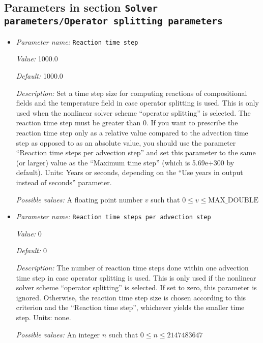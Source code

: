 \subsection{Parameters in section \tt Solver parameters/Operator splitting parameters}
\label{parameters:Solver_20parameters/Operator_20splitting_20parameters}

\begin{itemize}
\item {\it Parameter name:} {\tt Reaction time step}
\label{parameters:Solver parameters/Operator splitting parameters/Reaction time step}


{\it Value:} 1000.0


{\it Default:} 1000.0


{\it Description:} Set a time step size for computing reactions of compositional fields and the temperature field in case operator splitting is used. This is only used when the nonlinear solver scheme ``operator splitting'' is selected. The reaction time step must be greater than 0. If you want to prescribe the reaction time step only as a relative value compared to the advection time step as opposed to as an absolute value, you should use the parameter ``Reaction time steps per advection step'' and set this parameter to the same (or larger) value as the ``Maximum time step'' (which is 5.69e+300 by default). Units: Years or seconds, depending on the ``Use years in output instead of seconds'' parameter.


{\it Possible values:} A floating point number $v$ such that $0 \leq v \leq \text{MAX\_DOUBLE}$
\item {\it Parameter name:} {\tt Reaction time steps per advection step}
\label{parameters:Solver parameters/Operator splitting parameters/Reaction time steps per advection step}


{\it Value:} 0


{\it Default:} 0


{\it Description:} The number of reaction time steps done within one advection time step in case operator splitting is used. This is only used if the nonlinear solver scheme ``operator splitting'' is selected. If set to zero, this parameter is ignored. Otherwise, the reaction time step size is chosen according to this criterion and the ``Reaction time step'', whichever yields the smaller time step. Units: none.


{\it Possible values:} An integer $n$ such that $0\leq n \leq 2147483647$
\end{itemize}

